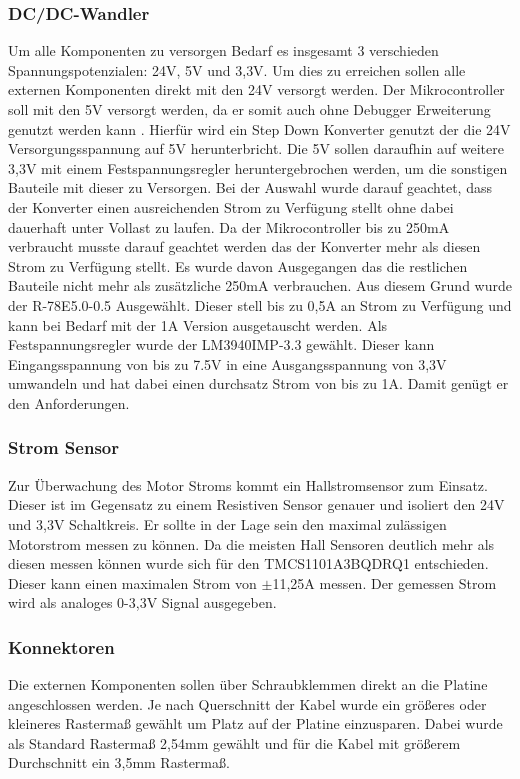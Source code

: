 \subsubsection{DC/DC-Wandler}
Um alle Komponenten zu versorgen Bedarf es insgesamt 3 verschieden Spannungspotenzialen: 24V, 5V und 3,3V. Um dies zu erreichen sollen alle externen Komponenten direkt mit den 24V versorgt werden. Der Mikrocontroller soll mit den 5V versorgt werden, da er somit auch ohne Debugger Erweiterung genutzt werden kann \cite{STM32}. Hierfür wird ein Step Down Konverter genutzt der die 24V Versorgungsspannung auf 5V herunterbricht. Die 5V sollen daraufhin auf weitere 3,3V mit einem Festspannungsregler heruntergebrochen werden, um die sonstigen Bauteile mit dieser zu Versorgen. Bei der Auswahl wurde darauf geachtet, dass der Konverter einen ausreichenden Strom zu Verfügung stellt ohne dabei dauerhaft unter Vollast zu laufen. Da der Mikrocontroller bis zu 250mA verbraucht musste darauf geachtet werden das der Konverter mehr als diesen Strom zu Verfügung stellt. Es wurde davon Ausgegangen das die restlichen Bauteile nicht mehr als zusätzliche 250mA verbrauchen. Aus diesem Grund wurde der R-78E5.0-0.5 Ausgewählt. Dieser stell bis zu 0,5A an Strom zu Verfügung und kann bei Bedarf mit der 1A Version ausgetauscht werden. Als Festspannungsregler wurde der LM3940IMP-3.3 gewählt. Dieser kann Eingangsspannung von bis zu 7.5V in eine Ausgangsspannung von 3,3V umwandeln und hat dabei einen durchsatz Strom von bis zu 1A. Damit genügt er den Anforderungen.
\subsubsection{Strom Sensor}
Zur Überwachung des Motor Stroms kommt ein Hallstromsensor zum Einsatz. Dieser ist im Gegensatz zu einem Resistiven Sensor genauer und isoliert den 24V und 3,3V Schaltkreis. Er sollte in der Lage sein den maximal zulässigen Motorstrom messen zu können. Da die meisten Hall Sensoren deutlich mehr als diesen messen können wurde sich für den TMCS1101A3BQDRQ1 entschieden. Dieser kann einen maximalen Strom von $\pm$11,25A messen. Der gemessen Strom wird als analoges 0-3,3V Signal ausgegeben.
\subsubsection{Konnektoren}
Die externen Komponenten sollen über Schraubklemmen direkt an die Platine angeschlossen werden. Je nach Querschnitt der Kabel wurde ein größeres oder kleineres Rastermaß gewählt um Platz auf der Platine einzusparen. Dabei wurde als Standard Rastermaß 2,54mm gewählt und für die Kabel mit größerem Durchschnitt ein 3,5mm Rastermaß.
